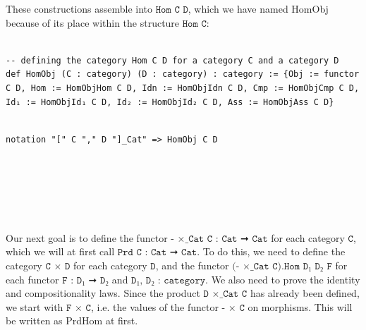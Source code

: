 \documentclass{book}
\newcounter{lcounter}
\newcounter{sectioncount}
\newcounter{subsectioncount}
\renewcommand{\section}[1]{\newpage
\ \\
\ \\
 \begin{center} \scalebox{1.5}{\texttt{\thesectioncount . #1}} \setcounter{sectioncount}{\thesectioncount+1} \setcounter{subsectioncount}{1} \end{center}
 \begin{center}

\ \\
\ \\

\thispagestyle{empty}
\end{center}
}
\begin{document}
These constructions assemble into $\texttt{Hom C D}$, which we have named HomObj because of its place within the structure $\texttt{Hom C}$:\\

\begin{center}
\begin{tcolorbox}[width=5in,colback={white},title={\begin{center}\texttt{Lean \thelcounter} \addtocounter{lcounter}{1}  \end{center}},colbacktitle=Blue,coltitle=black]
\begin{verbatim}

-- defining the category Hom C D for a category C and a category D
def HomObj (C : category) (D : category) : category := {Obj := functor C D, Hom := HomObjHom C D, Idn := HomObjIdn C D, Cmp := HomObjCmp C D, Id₁ := HomObjId₁ C D, Id₂ := HomObjId₂ C D, Ass := HomObjAss C D}

\end{verbatim}%
\end{tcolorbox}
\end{center}

\begin{center}
\begin{tcolorbox}[width=5in,colback={white},title={\begin{center}\texttt{Lean \thelcounter} \addtocounter{lcounter}{1}  \end{center}},colbacktitle=Blue,coltitle=black]
\begin{verbatim}

notation "[" C "," D "]_Cat" => HomObj C D

\end{verbatim}%
\end{tcolorbox}
\end{center}

\section{\texttt{Prd C : Cat ➞ Cat}}

Our next goal is to define the functor $\texttt{- ×_Cat C : Cat ➞ Cat}$ for each category $\texttt{C}$, which we will at first call $\texttt{Prd C : Cat ➞ Cat}$. To do this, we need to define the category $\texttt{C × D}$ for each category $\texttt{D}$, and the functor $\texttt{(- ×_Cat C).Hom D₁ D₂ F}$ for each functor $\texttt{F : D₁ ➞ D₂}$ and $\texttt{D₁, D₂ : category}$. We also need to prove the identity and compositionality laws. Since the product $\texttt{D ×_Cat C}$ has already been defined, we start with $\texttt{F × C}$, i.e. the values of the functor $\texttt{- × C}$ on morphisms. This will be written as PrdHom at first.\\
\end{document}

